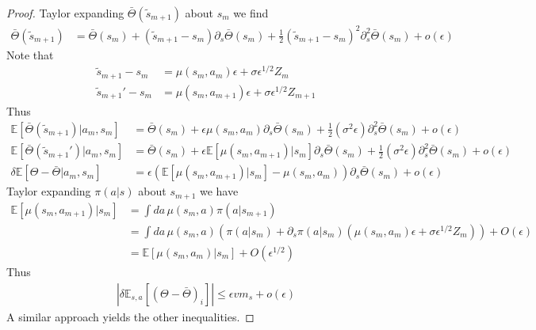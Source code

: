 \documentclass[10.5pt]{article}
\newcommand\bb{\mathbb}
\begin{document}
\begin{proof}
  Taylor expanding $\bar \Theta(\tilde s_{m+1})$ about $s_m$ we find 
  \begin{align*}
    \bar \Theta(\tilde s_{m+1}) &= \bar \Theta(s_m) + (\tilde s_{m+1} - s_m)\partial_s \bar \Theta(s_m) + \tfrac{1}{2}(\tilde s_{m+1} - s_m)^2\partial^2_s \bar \Theta(s_m) + o(\epsilon)
  \end{align*}
  Note that
  \begin{align*}
    \tilde s_{m+1} - s_m &= \mu(s_m, a_m)\epsilon + \sigma\epsilon^{1/2} Z_m\\
    \tilde s_{m+1}' - s_m &= \mu(s_m, a_{m+1})\epsilon + \sigma\epsilon^{1/2} Z_{m+1}
  \end{align*}
  Thus
  \begin{align*}
    \bb E[\bar \Theta(\tilde s_{m+1})|a_m,s_m] &= \bar \Theta(s_m) + \epsilon \mu(s_m,a_m)\partial_s \bar \Theta(s_m) + \tfrac{1}{2}(\sigma^2 \epsilon) \partial^2_s \bar \Theta(s_m) + o(\epsilon)\\
    \bb E[\bar \Theta(\tilde s_{m+1}')|a_m,s_m] &= \bar \Theta(s_m) + \epsilon \bb E[\mu(s_m,a_{m+1})|s_m]\partial_s \bar \Theta(s_m) + \tfrac{1}{2}(\sigma^2 \epsilon) \partial^2_s \bar \Theta(s_m) + o(\epsilon)\\
    \delta \bb E[ \Theta - \bar \Theta |a_m,s_m] &= \epsilon(\bb E[\mu(s_m,a_{m+1})|s_m] - \mu(s_m,a_m))\partial_s \bar \Theta(s_m) + o(\epsilon)
  \end{align*}
  Taylor expanding $\pi(a|s)$ about $s_{m+1}$ we have
  \begin{align*}
    \bb E[\mu(s_m,a_{m+1})|s_m] 
    &=  \int da\, \mu(s_m, a) \pi(a|s_{m+1})\\
    &=  \int da\, \mu(s_m, a) (\pi(a|s_m)+\partial_s \pi(a|s_m)(\mu(s_m,a_m)\epsilon + \sigma\epsilon^{1/2}Z_m)) + O(\epsilon)\\
    &= \bb E[\mu(s_m,a_m)|s_m] + O(\epsilon^{1/2})
  \end{align*}
  Thus
  \begin{align*}
    |\delta \bb E_{s,a}[(\Theta - \bar \Theta)_i]| \leq \epsilon v m_s + o(\epsilon)
  \end{align*}
  A similar approach yields the other inequalities.

\end{proof}
\end{document}
